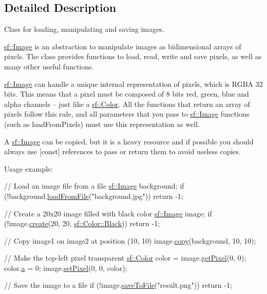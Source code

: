 \subsection{Detailed Description}
Class for loading, manipulating and saving images. 

\hyperlink{classsf_1_1_image}{sf\-::\-Image} is an abstraction to manipulate images as bidimensional arrays of pixels. The class provides functions to load, read, write and save pixels, as well as many other useful functions.

\hyperlink{classsf_1_1_image}{sf\-::\-Image} can handle a unique internal representation of pixels, which is R\-G\-B\-A 32 bits. This means that a pixel must be composed of 8 bits red, green, blue and alpha channels -- just like a \hyperlink{classsf_1_1_color}{sf\-::\-Color}. All the functions that return an array of pixels follow this rule, and all parameters that you pass to \hyperlink{classsf_1_1_image}{sf\-::\-Image} functions (such as load\-From\-Pixels) must use this representation as well.

A \hyperlink{classsf_1_1_image}{sf\-::\-Image} can be copied, but it is a heavy resource and if possible you should always use \mbox{[}const\mbox{]} references to pass or return them to avoid useless copies.

Usage example\-: 
\begin{DoxyCode}
\textcolor{comment}{// Load an image file from a file}
\hyperlink{classsf_1_1_image}{sf::Image} background;
\textcolor{keywordflow}{if} (!background.\hyperlink{classsf_1_1_image_a9e4f2aa8e36d0cabde5ed5a4ef80290b}{loadFromFile}(\textcolor{stringliteral}{"background.jpg"}))
    \textcolor{keywordflow}{return} -1;

\textcolor{comment}{// Create a 20x20 image filled with black color}
\hyperlink{classsf_1_1_image}{sf::Image} image;
\textcolor{keywordflow}{if} (!image.\hyperlink{classsf_1_1_image_a2a67930e2fd9ad97cf004e918cf5832b}{create}(20, 20, \hyperlink{classsf_1_1_color_a77c688197b981338f0b19dc58bd2facd}{sf::Color::Black}))
    \textcolor{keywordflow}{return} -1;

\textcolor{comment}{// Copy image1 on image2 at position (10, 10)}
image.\hyperlink{classsf_1_1_image_ab2fa337c956f85f93377dcb52153a45a}{copy}(background, 10, 10);

\textcolor{comment}{// Make the top-left pixel transparent}
\hyperlink{classsf_1_1_color}{sf::Color} color = image.\hyperlink{classsf_1_1_image_a8c8460e311dcb00557cb00a81c29163d}{getPixel}(0, 0);
color.\hyperlink{classsf_1_1_color_a56dbdb47d5f040d9b78ac6a0b8b3a831}{a} = 0;
image.\hyperlink{classsf_1_1_image_a9fd329b8cd7d4439e07fb5d3bb2d9744}{setPixel}(0, 0, color);

\textcolor{comment}{// Save the image to a file}
\textcolor{keywordflow}{if} (!image.\hyperlink{classsf_1_1_image_aec0ed16b67df7b512aaa5c53388ba14e}{saveToFile}(\textcolor{stringliteral}{"result.png"}))
    \textcolor{keywordflow}{return} -1;
\end{DoxyCode}



